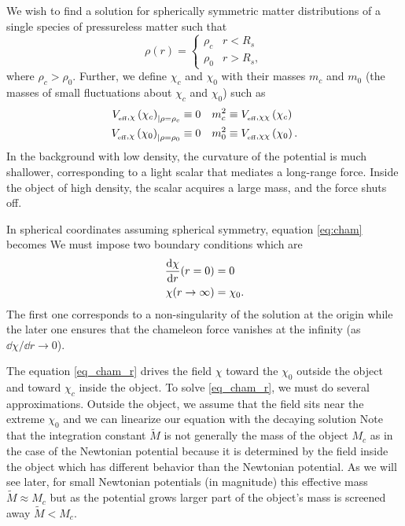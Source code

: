 We wish to find a solution for spherically symmetric matter distributions of a single species of pressureless matter such that
\begin{equation*}
\rho(r)=
\begin{cases}
\rho_c & r<R_s \\
\rho_0 & r>R_s,
\end{cases}
\end{equation*}
where $\rho_c>\rho_0$. Further, we define $\chi_c$ and $\chi_0$ with their masses $m_c$ and $m_0$ (the masses of small fluctuations about $\chi_c$ and $\chi_0$) such as
\begin{align*}
V_{_\text{\tiny eff},\chi}\left(\chi_c\right)_{|\rho=\rho_c}&\equiv0	&	m^2_c&\equiv V_{_\text{\tiny eff},\chi\chi}\left(\chi_c\right) \\
V_{_\text{\tiny eff},\chi}\left(\chi_0\right)_{|\rho=\rho_0}&\equiv0	&	m^2_0&\equiv V_{_\text{\tiny eff},\chi\chi}\left(\chi_0\right).
\end{align*}
In the background with low density, the curvature of the potential is much shallower, corresponding to a light scalar that mediates a long-range force. Inside the object of high density, the scalar acquires a large mass, and the force shuts off.

In spherical coordinates assuming spherical symmetry, equation \eqref{eq:cham} becomes
We must impose two boundary conditions which are
\begin{align*}
\frac{\mbox{d} \chi}{\mbox{d} r}(r=0)&=0 \\
\chi(r\rightarrow\infty)&=\chi_0.
\end{align*}
The first one corresponds to a non-singularity of the solution at the origin while the later one ensures that the chameleon force vanishes at the infinity (as $\dd\chi/\dd r\rightarrow0$).

The equation \eqref{eq_cham_r} drives the field $\chi$ toward the $\chi_0$ outside the object and toward $\chi_c$ inside the object. To solve \eqref{eq_cham_r}, we must do several approximations. Outside the object, we assume that the field sits near the extreme $\chi_0$ and we can linearize our equation
with the decaying solution
Note that the integration constant $\tilde{M}$ is not generally the mass of the object $M_c$ as in the case of the Newtonian potential because it is determined by the field inside the object which has different behavior than the Newtonian potential. As we will see later, for small Newtonian potentials (in magnitude) this effective mass $\tilde{M}\approx M_c$ but as the potential grows larger part of the object's mass is screened away $\tilde{M}< M_c$.

